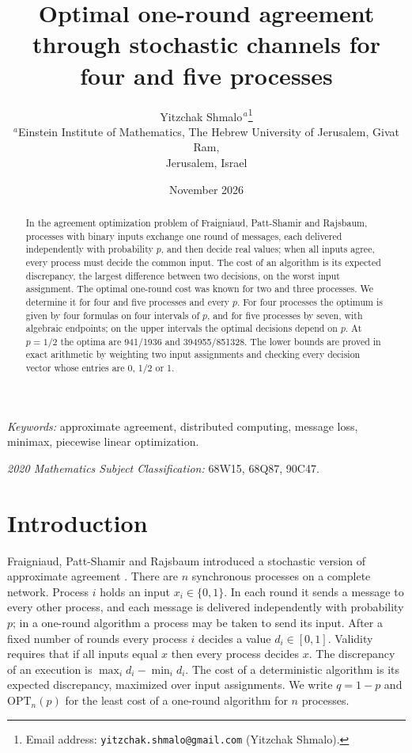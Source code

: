 \documentclass[11pt]{article}
\title{Optimal one-round agreement through stochastic channels for four and five processes}
\author{Yitzchak Shmalo$^{\,a}$\thanks{Email address:
\texttt{yitzchak.shmalo@gmail.com} (Yitzchak Shmalo).}\\
{\small $^{a}$Einstein Institute of Mathematics, The Hebrew University of
Jerusalem, Givat Ram,}\\
{\small Jerusalem, Israel}}
\date{November 2026}
\newcommand{\OPT}{\mathrm{OPT}}
\begin{document}
\maketitle

\begin{abstract}
In the agreement optimization problem of Fraigniaud, Patt-Shamir and Rajsbaum, processes with binary inputs exchange one round of messages, each delivered independently with probability $p$, and then decide real values; when all inputs agree, every process must decide the common input. The cost of an algorithm is its expected discrepancy, the largest difference between two decisions, on the worst input assignment. The optimal one-round cost was known for two and three processes. We determine it for four and five processes and every $p$. For four processes the optimum is given by four formulas on four intervals of $p$, and for five processes by seven, with algebraic endpoints; on the upper intervals the optimal decisions depend on $p$. At $p=1/2$ the optima are 941/1936 and 394955/851328. The lower bounds are proved in exact arithmetic by weighting two input assignments and checking every decision vector whose entries are 0, 1/2 or 1.
\end{abstract}

\noindent\textit{Keywords:} approximate agreement, distributed computing, message loss, minimax, piecewise linear optimization.

\noindent\textit{2020 Mathematics Subject Classification:} 68W15, 68Q87, 90C47.

\section{Introduction}\label{sec:intro}

Fraigniaud, Patt-Shamir and Rajsbaum \cite{FPR} introduced a stochastic version of approximate agreement \cite{DLPSW}. There are $n$ synchronous processes on a complete network. Process $i$ holds an input $x_i\in\{0,1\}$. In each round it sends a message to every other process, and each message is delivered independently with probability $p$; in a one-round algorithm a process may be taken to send its input. After a fixed number of rounds every process $i$ decides a value $d_i\in[0,1]$. Validity requires that if all inputs equal $x$ then every process decides $x$. The discrepancy of an execution is $\max_i d_i-\min_i d_i$. The cost of a deterministic algorithm is its expected discrepancy, maximized over input assignments. We write $q=1-p$ and $\OPT_n(p)$ for the least cost of a one-round algorithm for $n$ processes.
\end{document}
